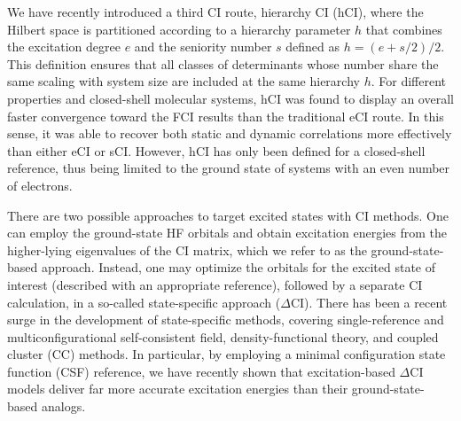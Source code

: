 \documentclass[aip,jcp,reprint,noshowkeys,superscriptaddress]{revtex4-1}
\begin{document}
We have recently introduced a third CI route, hierarchy CI (hCI), \cite{Kossoski_2022}
where the Hilbert space is partitioned according to a hierarchy parameter $h$ that combines the excitation degree $e$ and the seniority number $s$ defined as $h = (e+s/2)/2$.
This definition ensures that all classes of determinants whose number share the same scaling with system size are included at the same hierarchy $h$.
For different properties and closed-shell molecular systems,
hCI was found to display an overall faster convergence toward the FCI results than the traditional eCI route. \cite{Kossoski_2022}
In this sense, it was able to recover both static and dynamic correlations more effectively than either eCI or sCI.
However, hCI has only been defined for a closed-shell reference, thus being limited to the ground state of systems with an even number of electrons.

There are two possible approaches to target excited states with CI methods.
One can employ the ground-state HF orbitals and obtain excitation energies from the higher-lying eigenvalues of the CI matrix, which we refer to as the ground-state-based approach.
Instead, one may optimize the orbitals for the excited state of interest (described with an appropriate reference), followed by a separate CI calculation,
in a so-called state-specific approach ($\Delta$CI).
There has been a recent surge in the development of state-specific methods, covering
single-reference and multiconfigurational self-consistent field,
\cite{Ziegler_1977,Burton_2021,Shea_2018,Tran_2019,Tran_2020,Hardikar_2020,Burton_2022,Hanscam_2022,Kossoski_2023,Marie_2023}
density-functional theory,
\cite{Filatov_1999,Kowalczyk_2011,Kowalczyk_2013,Gilbert_2008,Barca_2018,Hait_2020,Hait_2021,Hardikar_2020,Zhao_2020,Levi_2020,Carter-Fenk_2020,Toffoli_2022,Schmerwitz_2022,Schmerwitz_2023}
and coupled cluster (CC)
\cite{Piecuch_2000,Mayhall_2010,Lee_2019,Kossoski_2021,Marie_2021,Rishi_2023}
methods.
In particular, by employing a minimal configuration state function (CSF) reference,
we have recently shown that excitation-based $\Delta$CI models deliver far more accurate excitation energies than their ground-state-based analogs. \cite{Kossoski_2023}
\end{document}
